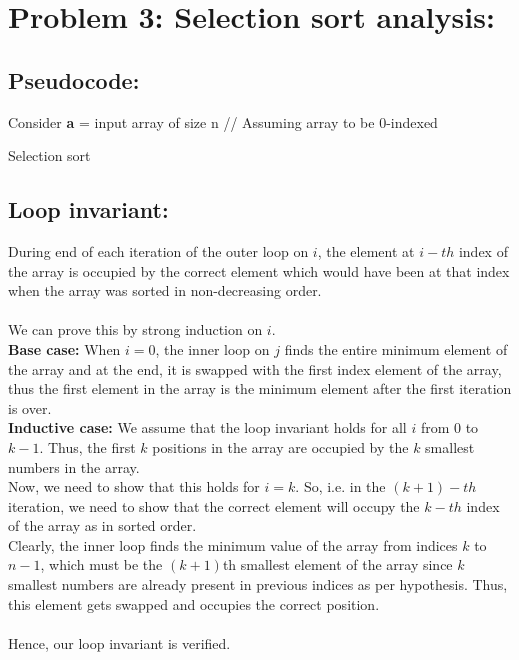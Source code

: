 \documentclass[12pt]{report}
\begin{document}
\section{Problem 3: Selection sort analysis:}

\subsection{Pseudocode:}
\begin{algorithm}[H]
	\SetAlgoLined
	Consider \textbf{a} = input array of size n \;
	// Assuming array to be 0-indexed \\ 
	\caption{Selection sort}	
\end{algorithm}
\subsection{Loop invariant:}
During end of each iteration of the outer loop on $i$, the element at $i-th$ index of the array is occupied by the correct element which would have been at that index when the array was sorted in non-decreasing order.
\\ \\ 
We can prove this by strong induction on $i$. 
\\
\textbf{Base case: } When $i = 0$, the inner loop on $j$ finds the entire minimum element of the array and at the end, it is swapped with the first index element of the array, thus the first element in the array is the minimum element after the first iteration is over. 
\\
\textbf{Inductive case:} We assume that the loop invariant holds for all $i$ from $0$ to $k - 1$. Thus, the first $k$ positions in the array are occupied by the $k$ smallest numbers in the array. 
\\
Now, we need to show that this holds for $i = k$. So, i.e. in the $(k+1)-th$ iteration, we need to show that the correct element will occupy the $k-th$ index of the array as in sorted order. 
\\
Clearly, the inner loop finds the minimum value of the array from indices $k$ to $n - 1$, which must be the $(k + 1)$th smallest element of the array since $k$ smallest numbers are already present in previous indices as per hypothesis. Thus, this element gets swapped and occupies the correct position. 
\\ \\
Hence, our loop invariant is verified. 
\end{document}
